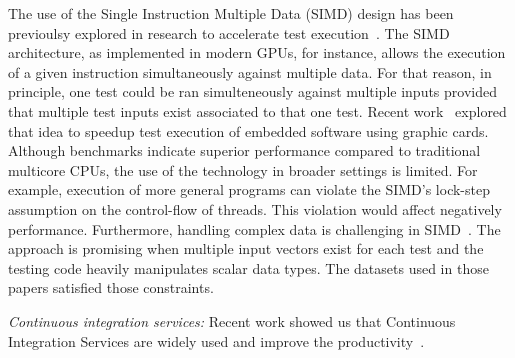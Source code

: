 The use of the Single Instruction Multiple Data (SIMD) design has been
previoulsy explored in research to accelerate test
execution~\cite{damorim-etal-issta2007,damorim-etal-tse2008,kim-etal-issre2012,nguyen-etal-icse2014,rajan-etal-ase2014,sen-etal-fse2015,yaneva-etal-issta2017}. The
SIMD architecture, as implemented in modern GPUs, for instance, allows
the execution of a given instruction simultaneously against multiple
data.  For that reason, in principle, one test could be ran
simulteneously against multiple inputs provided that multiple test
inputs exist associated to that one test.  Recent
work~\cite{rajan-etal-ase2014,yaneva-etal-issta2017} explored that
idea to speedup test execution of embedded software using graphic
cards. Although benchmarks indicate superior performance compared to
traditional multicore CPUs, the use of the technology in broader
settings is limited. For example, execution of more general programs
can violate the SIMD's lock-step assumption on the control-flow of
threads.  This violation would affect negatively performance.
Furthermore, handling complex data is challenging in
SIMD~\cite{damorim-etal-issta2007,damorim-etal-tse2008}.  The approach
is promising when multiple input vectors exist for each test and the
testing code heavily manipulates scalar data types.  The datasets used
in those papers satisfied those constraints.




\textit{Continuous integration services:}
Recent work showed us that Continuous Integration Services are widely
used and improve the productivity~. 



